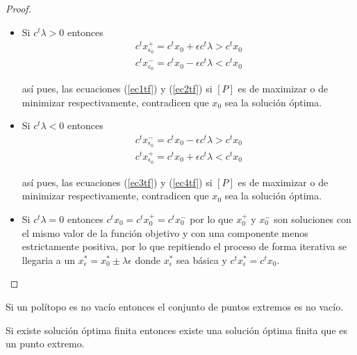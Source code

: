 \begin{proof}
\begin{enumerate}
\begin{itemize}
      \begin{itemize}
        \item Si $c^t\lambda>0$ entonces 
        \begin{eqnarray}
          c^tx_{\epsilon_0}^+=c^tx_0+\epsilon c^t\lambda > c^tx_0\label{ec1tf}\\
          c^tx_{\epsilon_0}^-=c^tx_0-\epsilon c^t\lambda < c^tx_0\label{ec2tf}
        \end{eqnarray}
        
        así pues, las ecuaciones (\ref{ec1tf}) y (\ref{ec2tf}) si $[P]$ es de maximizar o de minimizar respectivamente, contradicen que $x_0$ sea la solución óptima.
        
        \item Si $c^t\lambda<0$ entonces 
        \begin{eqnarray}
          c^tx_{\epsilon_0}^-=c^tx_0-\epsilon c^t\lambda > c^tx_0\label{ec3tf}\\
          c^tx_{\epsilon_0}^+=c^tx_0+\epsilon c^t\lambda < c^tx_0\label{ec4tf}
        \end{eqnarray}
        
        así pues, las ecuaciones (\ref{ec3tf}) y (\ref{ec4tf}) si $[P]$ es de maximizar o de minimizar respectivamente, contradicen que $x_0$ sea la solución óptima.
        
        \item Si $c^t\lambda=0$ entonces $c^tx_0=c^tx_0^+=c^tx_0^-$ por lo que $x_0^+$ y $x_0^-$ son soluciones con el mismo valor de la función objetivo y con una componente menos estrictamente positiva, por lo que repitiendo el proceso de forma iterativa se llegaria a un $x_\epsilon^*=x_0^*\pm\lambda\epsilon$ donde $x_\epsilon^*$ sea básica y $c^tx_\epsilon^*=c^tx_0$.
      \end{itemize} 
    \end{itemize}
  \end{enumerate}
  
\end{proof}


\begin{corolario}
  Si un polítopo es no vacío entonces el conjunto de puntos extremos es no vacío.
\end{corolario}

\begin{corolario}
  Si existe solución óptima finita entonces existe una solución óptima finita que es un punto extremo.
\end{corolario}

